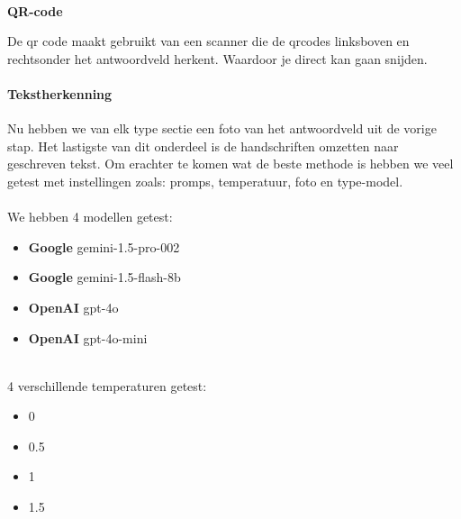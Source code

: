 \documentclass[12pt]{article}
\begin{document}
\\
\textbf{QR-code}\\
\begin{multicols}{2}
De qr code maakt gebruikt van een scanner die de qrcodes linksboven en rechtsonder het antwoordveld herkent. Waardoor je direct kan gaan snijden.
\end{multicols}


\paragraph*{Tekstherkenning}
\begin{multicols}{2}
Nu hebben we van elk type sectie een foto van het antwoordveld uit de vorige stap. Het lastigste van dit onderdeel is de handschriften omzetten naar geschreven tekst. Om erachter te komen wat de beste methode is hebben we veel getest met instellingen zoals: promps, temperatuur, foto en type-model.\\
\\
We hebben 4 modellen getest:
\begin{itemize}
    \item \textbf{Google} gemini-1.5-pro-002
    \item \textbf{Google} gemini-1.5-flash-8b
    \item \textbf{OpenAI} gpt-4o
    \item \textbf{OpenAI} gpt-4o-mini
\end{itemize}
\\
4 verschillende temperaturen getest:
\begin{itemize}
    \item 0
    \item 0.5
    \item 1
    \item 1.5
\end{itemize}
\end{multicols}
\pagebreak
\end{document}
